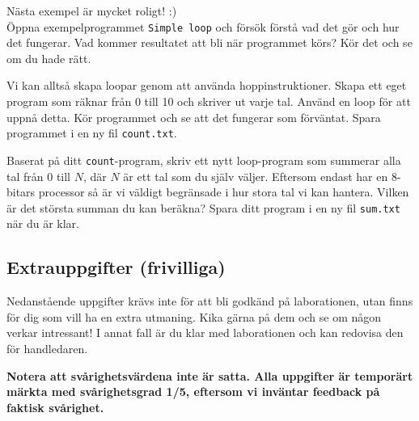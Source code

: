 \begin{Datorarbete}
    \item {} Nästa exempel är mycket roligt! :) \\
    Öppna exempelprogrammet \texttt{Simple loop} och försök förstå vad det gör och hur det fungerar. Vad kommer resultatet att bli när programmet körs? Kör det och se om du hade rätt.

    \item {} Vi kan alltså skapa loopar genom att använda hoppinstruktioner. Skapa ett eget program som räknar från 0 till 10 och skriver ut varje tal. Använd en loop för att uppnå detta. Kör programmet och se att det fungerar som förväntat. Spara programmet i en ny fil \texttt{count.txt}.
    
    \item {} Baserat på ditt \texttt{count}-program, skriv ett nytt loop-program som summerar alla tal från 0 till \(N\), där \(N\) är ett tal som du själv väljer. Eftersom \progname{} endast har en 8-bitars processor så är vi väldigt begränsade i hur stora tal vi kan hantera. Vilken är det största summan du kan beräkna? Spara ditt program i en ny fil \texttt{sum.txt} när du är klar.
\end{Datorarbete}


\subsection{Extrauppgifter (frivilliga)}

Nedanstående uppgifter krävs inte för att bli godkänd på laborationen, utan finns för dig som vill ha en extra utmaning. Kika gärna på dem och se om någon verkar intressant! I annat fall är du klar med laborationen och kan redovisa den för handledaren.

\halfblankline
\noindent\textbf{Notera att svårighetsvärdena inte är satta. Alla uppgifter är temporärt märkta med svårighetsgrad 1/5, eftersom vi inväntar feedback på faktisk svårighet.}

